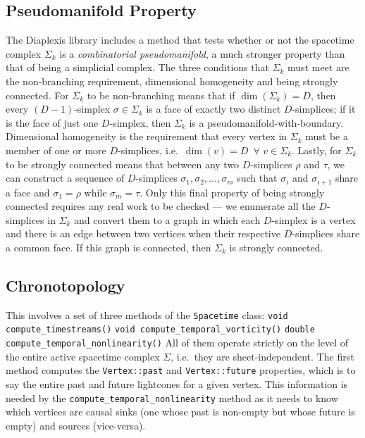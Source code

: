 \documentclass[12pt,letterpaper]{report}
\begin{document}
\subsection{Pseudomanifold Property}  

The Diaplexis library includes a method that tests whether or not the spacetime complex $\Sigma_k$ is a 
\emph{combinatorial pseudomanifold}, a much stronger property than that of being a simplicial complex. 
The three conditions that $\Sigma_k$ must meet are the non-branching requirement, dimensional homogeneity 
and being strongly connected. For $\Sigma_k$ to be non-branching means that if $\dim(\Sigma_k) = D$, then 
every $(D-1)$-simplex $\sigma\in\Sigma_k$ is a face of exactly two distinct $D$-simplices; if it is the 
face of just one $D$-simplex, then $\Sigma_k$ is a pseudomanifold-with-boundary. Dimensional homogeneity 
is the requirement that every vertex in $\Sigma_k$ must be a member of one or more $D$-simplices, i.e.\ 
$\dim(v) = D \,\,\, \forall \,\, v\in\Sigma_k$. Lastly, for $\Sigma_k$ to be strongly connected means that 
between any two $D$-simplices $\rho$ and $\tau$, we can construct a sequence of $D$-simplices 
$\sigma_1,\sigma_2,\dots,\sigma_m$ such that $\sigma_i$ and $\sigma_{i+1}$ share a face and $\sigma_1 = \rho$ 
while $\sigma_m = \tau$. Only this final property of being strongly connected requires any real work to 
be checked --- we enumerate all the $D$-simplices in $\Sigma_k$ and convert them to a graph in which 
each $D$-simplex is a vertex and there is an edge between two vertices when their respective $D$-simplices 
share a common face. If this graph is connected, then $\Sigma_k$ is strongly connected.    

\subsection{Chronotopology}

This involves a set of three methods of the \texttt{Spacetime} class:\newline
\texttt{void compute\_timestreams()}\newline
\texttt{void compute\_temporal\_vorticity()}\newline
\texttt{double compute\_temporal\_nonlinearity()}\newline
All of them operate strictly on the level of the entire active spacetime complex $\Sigma$, i.e.\ they are 
sheet-independent. The first method computes the \texttt{Vertex::past} and \texttt{Vertex::future} properties, 
which is to say the entire past and future lightcones for a given vertex. This information is needed by 
the \texttt{compute\_temporal\_nonlinearity} method as it needs to know which vertices are causal sinks (one 
whose past is non-empty but whose future is empty) and sources (vice-versa). 
\end{document}
